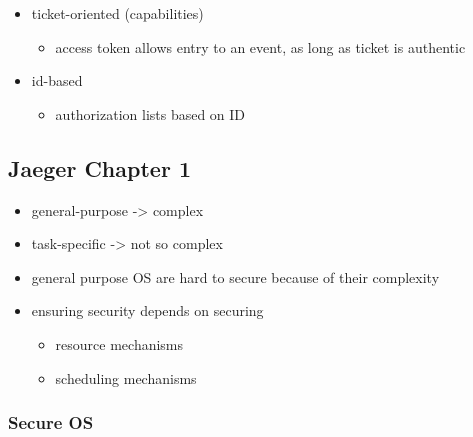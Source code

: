 \documentclass[
  12pt]{findlay}
\providecommand{\tightlist}{%
  \setlength{\itemsep}{0pt}\setlength{\parskip}{0pt}}
\begin{document}
\begin{itemize}
  \begin{itemize}
  \tightlist
  \item
    ticket-oriented (capabilities)

    \begin{itemize}
    \tightlist
    \item
      access token allows entry to an event, as long as ticket is
      authentic
    \end{itemize}
  \item
    id-based

    \begin{itemize}
    \tightlist
    \item
      authorization lists based on ID
    \end{itemize}
  \end{itemize}
\end{itemize}

\hypertarget{jaeger-chapter-1}{%
\subsection{Jaeger Chapter 1}\label{jaeger-chapter-1}}

\begin{itemize}
\tightlist
\item
  general-purpose -\textgreater{} complex
\item
  task-specific -\textgreater{} not so complex
\item
  general purpose OS are hard to secure because of their complexity
\item
  ensuring security depends on securing

  \begin{itemize}
  \tightlist
  \item
    resource mechanisms
  \item
    scheduling mechanisms
  \end{itemize}
\end{itemize}

\hypertarget{secure-os-1}{%
\subsubsection{Secure OS}\label{secure-os-1}}
\end{document}
